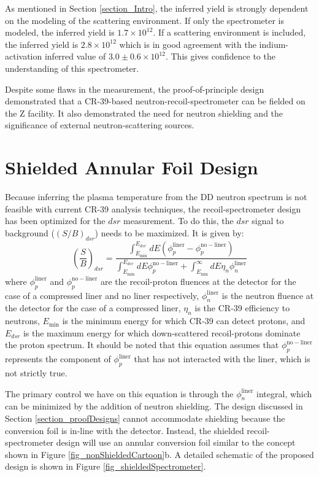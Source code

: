 As mentioned in Section \ref{section_Intro}, the inferred yield is strongly dependent on the modeling of the scattering environment. If only the spectrometer is modeled, the inferred yield is $1.7\times10^{12}$. If a scattering environment is included, the inferred yield is $2.8\times10^{12}$ which is in good agreement with the indium-activation inferred value of $3.0\pm0.6\times10^{12}$. This gives confidence to the understanding of this spectrometer.

Despite some flaws in the measurement, the proof-of-principle design demonstrated that a CR-39-based neutron-recoil-spectrometer can be fielded on the Z facility. It also demonstrated the need for neutron shielding and the significance of external neutron-scattering sources. 



\section{Shielded Annular Foil Design}
\label{section_nextDesign}

Because inferring the plasma temperature from the DD neutron spectrum is not feasible with current CR-39 analysis techniques, the recoil-spectrometer design has been optimized for the $dsr$ measurement. To do this, the $dsr$ signal to background ($(S/B)_{dsr}$) needs to be maximized. It is given by:
%
\begin{equation}
	\left(\frac{S}{B}\right)_{dsr} = \frac{\int_{E_{\mathrm{min}}}^{E_{dsr}}dE\left(\phi_p^{\mathrm{liner}} - \phi_p^{\mathrm{no-liner}}\right)}{\int_{E_{\mathrm{min}}}^{E_{dsr}}dE\phi_p^{\mathrm{no-liner}} + \int_{E_{\mathrm{min}}}^{\infty}dE\eta_n\phi_n^{\mathrm{liner}}}
	\label{eq_signal2Background}
\end{equation} 
%
where $\phi_p^{\mathrm{liner}}$ and $\phi_p^{\mathrm{no-liner}}$ are the recoil-proton fluences at the detector for the case of a compressed liner and no liner respectively, $\phi_n^{\mathrm{liner}}$ is the neutron fluence at the detector for the case of a compressed liner, $\eta_n$ is the CR-39 efficiency to neutrons, $E_{\mathrm{min}}$ is the minimum energy for which CR-39 can detect protons, and $E_{dsr}$ is the maximum energy for which down-scattered recoil-protons dominate the proton spectrum. It should be noted that this equation assumes that $\phi_p^{\mathrm{no-liner}}$ represents the component of $\phi_p^{\mathrm{liner}}$ that has not interacted with the liner, which is not strictly true.

The primary control we have on this equation is through the $\phi_n^{\mathrm{liner}}$ integral, which can be minimized by the addition of neutron shielding. The design discussed in Section \ref{section_proofDesigns} cannot accommodate shielding because the conversion foil is in-line with the detector. Instead, the shielded recoil-spectrometer design will use an annular conversion foil similar to the concept shown in Figure \ref{fig_nonShieldedCartoon}b. A detailed schematic of the proposed design is shown in Figure \ref{fig_shieldedSpectrometer}. 

